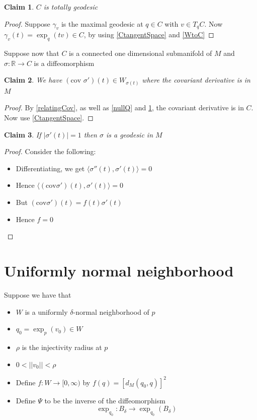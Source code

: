 \documentclass[a4paper,11pt]{article}
\newtheorem{claim}{Claim}
\begin{document}
\begin{claim}\label{totalC}
  $C$ is totally geodesic
\end{claim}

\begin{proof}
  Suppose $\gamma_v$ is the maximal geodesic at $q \in C$ with $v \in T_qC$. Now $\gamma_v(t)=\exp_q(tv) \in C$, by using \ref{CtangentSpace} and \ref{WtoC}
\end{proof}

Suppose now that $C$ is a connected one dimensional submanifold of $M$ and $\sigma: \mathbb{R} \to C$ is a diffeomorphism

\begin{claim}
  We have $(\text{cov }\sigma')(t) \in W_{\sigma(t)}$ where the covariant derivative is in $M$
\end{claim}

\begin{proof}
  By \ref{relatingCov}, as well as \ref{nullQ} and \ref{totalC}, the covariant derivative is in $C$. Now use \ref{CtangentSpace}.
\end{proof}

\begin{claim}
  If $|\sigma'(t)|=1$ then $\sigma$ is a geodesic in $M$
\end{claim}

\begin{proof}
  Consider the following:
  \begin{itemize}
    \item Differentiating, we get $\langle \sigma''(t), \sigma'(t) \rangle=0$ 
    \item Hence $\langle (\text{cov}\sigma')(t), \sigma'(t) \rangle=0$
    \item But $(\text{cov}\sigma')(t) = f(t)\sigma'(t)$
    \item Hence $f=0$
  \end{itemize}

\end{proof}

\section{Uniformly normal neighborhood}

Suppose we have that

\begin{itemize}
  \item $W$ is a uniformly $\delta$-normal neighborhood of $p$
  \item $q_0=\exp_p(v_0) \in W$
  \item $\rho$ is the injectivity radius at $p$
  \item $0<||v_0||<\rho$
  \item Define $f:W \to [0,\infty)$ by $f(q)= [d_M(q_0,q)]^2$
  \item Define $\Psi$ to be the inverse of the diffeomorphism \[\exp_{q_0}:B_\delta \to \exp_{q_0}(B_\delta)\]
\end{itemize}
\end{document}
